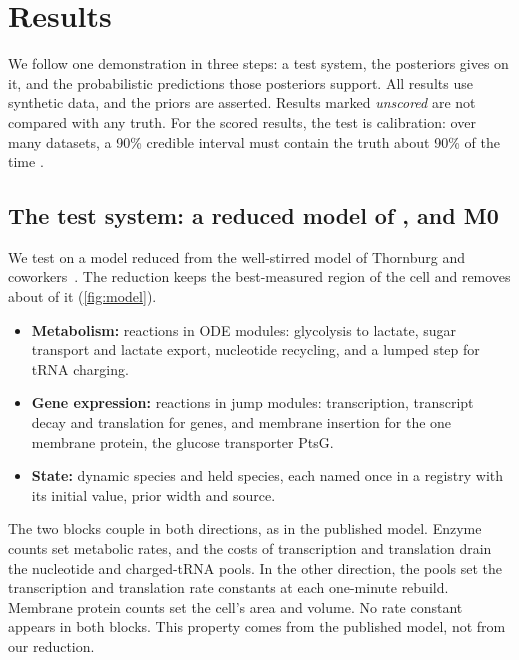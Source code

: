 \section{Results}
\label{sec:results}

We follow one demonstration in three steps: a test system, the posteriors \IC{} gives on it, and
the probabilistic predictions those posteriors support. All results use synthetic data, and the
priors are asserted. Results marked \emph{unscored} are not compared with any truth. For the scored
results, the test is calibration: over many datasets, a 90\% credible interval must contain the
truth about 90\% of the time \cite{talts2018validating}.

\subsection{The test system: a reduced model of \syn{}, and M0}
\label{sec:model}

We test \IC{} on a model reduced from the well-stirred \syn{} model of
Thornburg and coworkers~\cite{thornburg2022fundamental}. The reduction keeps the best-measured region of
the cell and removes about  of it (\cref{fig:model}).

\begin{itemize}
  \item \textbf{Metabolism:}  reactions in  ODE
  modules: glycolysis to lactate, sugar transport and lactate export, nucleotide
  recycling, and a lumped step for tRNA charging.
  \item \textbf{Gene expression:}  reactions in
   jump modules: transcription, transcript decay and
  translation for  genes, and membrane insertion for the one
  membrane protein, the glucose transporter PtsG.
  \item \textbf{State:}  dynamic species and 
  held species, each named once in a registry with its initial value, prior width
  and source.
\end{itemize}

The two blocks couple in both directions, as in the published model. Enzyme counts
set metabolic rates, and the costs of transcription and translation drain the
nucleotide and charged-tRNA pools. In the other direction, the pools set the
transcription and translation rate constants at each one-minute rebuild. Membrane
protein counts set the cell's area and volume. No rate constant appears in both
blocks. This property comes from the published model, not from our reduction.


